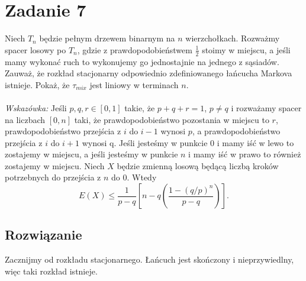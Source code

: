 \section{Zadanie 7}
Niech \(T_n\) będzie pełnym drzewem binarnym na \(n\) wierzchołkach. Rozważmy spacer losowy po \(T_n\), gdzie z prawdopodobieństwem \(\frac{1}{2}\) stoimy w miejscu, a jeśli mamy wykonać ruch to wykonujemy go jednostajnie na jednego z sąsiadów. Zauważ, że rozkład stacjonarny odpowiednio zdefiniowanego łańcucha Markova istnieje. Pokaż, że \(\tau_{mix}\) jest liniowy w terminach \(n\).\\
\\
\textit{Wskazówka:} Jeśli \(p,q,r \in [0,1]\) takie, że \(p+q+r=1\), \(p \neq q\) i rozważamy spacer na liczbach \([0,n]\) taki, że prawdopodobieństwo pozostania w miejscu to \(r\), prawdopodobieństwo przejścia z \(i\) do \(i-1\) wynosi \(p\), a prawdopodobieństwo przejścia z \(i\) do \(i+1\) wynosi q. Jeśli jesteśmy w punkcie 0 i mamy iść w lewo to zostajemy w miejscu, a jeśli jesteśmy w punkcie \(n\) i mamy iść w prawo to również zostajemy w miejscu. Niech \(X\) będzie zmienną losową będącą liczbą kroków potrzebnych do przejścia z \(n\) do \(0\). Wtedy
\[
	E(X) \leq \frac{1}{p-q}\left[n-q\left(\frac{1-(q/p)^n}{p-q}\right)\right].
\]

\subsection*{Rozwiązanie}

Zacznijmy od rozkładu stacjonarnego. Łańcuch jest skończony i nieprzywiedlny, więc taki rozkład istnieje. \\

